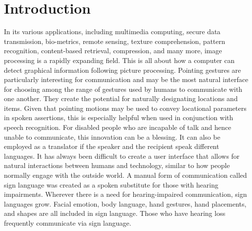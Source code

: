 \documentclass[fleqn, 11pt, twoside]{IOEGC}
\begin{document}
    
\maketitle
\thispagestyle{1. Introduction} 

\section{Introduction}
In its various applications, including multimedia computing, secure data transmission, bio-metrics, remote sensing, texture comprehension, pattern recognition, content-based retrieval, compression, and many more, image processing is a rapidly expanding field. This is all about how a computer can detect graphical information following picture processing. Pointing gestures are particularly interesting for communication and may be the most natural interface for choosing among the range of gestures used by humans to communicate with one another. They create the potential for naturally designating locations and items. Given that pointing motions may be used to convey locational parameters in spoken assertions, this is especially helpful when used in conjunction with speech recognition. For disabled people who are incapable of talk and hence unable to communicate, this innovation can be a blessing. It can also be employed as a translator if the speaker and the recipient speak different languages. It has always been difficult to create a user interface that allows for natural interactions between humans and technology, similar to how people normally engage with the outside world. A manual form of communication called sign language was created as a spoken substitute for those with hearing impairments. Wherever there is a need for hearing-impaired communication, sign languages grow. Facial emotion, body language, hand gestures, hand placements, and shapes are all included in sign language. Those who have hearing loss frequently communicate via sign language.
\end{document}
